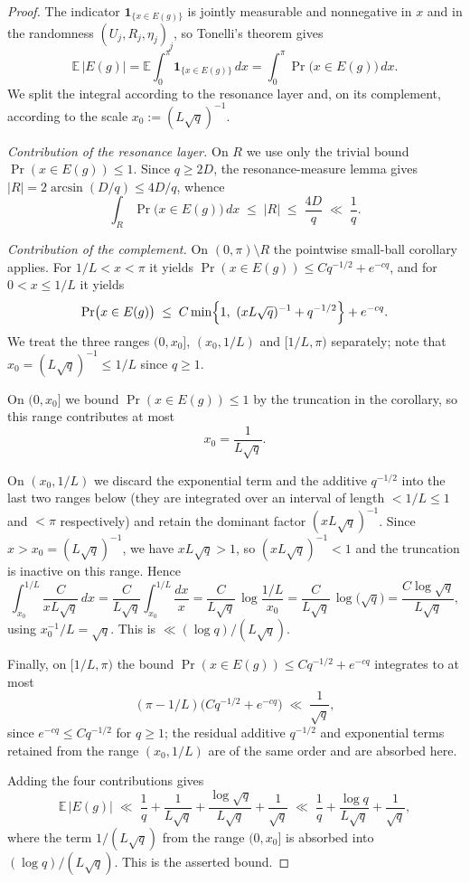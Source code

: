 \documentclass[11pt,reqno]{amsart}
\theoremstyle{plain}
\theoremstyle{definition}
\theoremstyle{remark}
\begin{document}
\begin{proof}
The indicator $\mathbf 1_{\{x\in E(g)\}}$ is jointly measurable and nonnegative in $x$ and in the randomness $(U_j,R_j,\eta_j)_j$, so Tonelli's theorem gives
\[
\mathbb{E}\,|E(g)|
=\mathbb{E}\int_{0}^{\pi}\mathbf 1_{\{x\in E(g)\}}\,dx
=\int_{0}^{\pi}\Pr\bigl(x\in E(g)\bigr)\,dx.
\]
We split the integral according to the resonance layer and, on its complement, according to the scale $x_{0}:=(L\sqrt q)^{-1}$.

\emph{Contribution of the resonance layer.}
On $R$ we use only the trivial bound $\Pr(x\in E(g))\le 1$. Since $q\ge 2D$, the resonance-measure lemma gives $|R|=2\arcsin(D/q)\le 4D/q$, whence
\[
\int_{R}\Pr\bigl(x\in E(g)\bigr)\,dx\;\le\;|R|\;\le\;\frac{4D}{q}\;\ll\;\frac{1}{q}.
\]

\emph{Contribution of the complement.}
On $(0,\pi)\setminus R$ the pointwise small-ball corollary applies. For $1/L<x<\pi$ it yields $\Pr(x\in E(g))\le C q^{-1/2}+e^{-cq}$, and for $0<x\le 1/L$ it yields
\[
\Pr\bigl(x\in E(g)\bigr)\;\le\;C\min\Bigl\{1,\ (xL\sqrt q)^{-1}+q^{-1/2}\Bigr\}+e^{-cq}.
\]
We treat the three ranges $(0,x_{0}]$, $(x_{0},1/L)$ and $[1/L,\pi)$ separately; note that $x_0=(L\sqrt q)^{-1}\le 1/L$ since $q\ge 1$.

On $(0,x_{0}]$ we bound $\Pr(x\in E(g))\le 1$ by the truncation in the corollary, so this range contributes at most
\[
x_{0}=\frac{1}{L\sqrt q}.
\]

On $(x_{0},1/L)$ we discard the exponential term and the additive $q^{-1/2}$ into the last two ranges below (they are integrated over an interval of length $<1/L\le 1$ and $<\pi$ respectively) and retain the dominant factor $(xL\sqrt q)^{-1}$. Since $x>x_{0}=(L\sqrt q)^{-1}$, we have $x L\sqrt q>1$, so $(xL\sqrt q)^{-1}<1$ and the truncation is inactive on this range. Hence
\[
\int_{x_{0}}^{1/L}\frac{C}{xL\sqrt q}\,dx
=\frac{C}{L\sqrt q}\int_{x_{0}}^{1/L}\frac{dx}{x}
=\frac{C}{L\sqrt q}\,\log\frac{1/L}{x_{0}}
=\frac{C}{L\sqrt q}\,\log\bigl(\sqrt q\bigr)
=\frac{C\log\sqrt q}{L\sqrt q},
\]
using $x_{0}^{-1}/L=\sqrt q$. This is $\ll (\log q)/(L\sqrt q)$.

Finally, on $[1/L,\pi)$ the bound $\Pr(x\in E(g))\le Cq^{-1/2}+e^{-cq}$ integrates to at most
\[
(\pi-1/L)\bigl(Cq^{-1/2}+e^{-cq}\bigr)\;\ll\;\frac{1}{\sqrt q},
\]
since $e^{-cq}\le C q^{-1/2}$ for $q\ge 1$; the residual additive $q^{-1/2}$ and exponential terms retained from the range $(x_0,1/L)$ are of the same order and are absorbed here.

Adding the four contributions gives
\[
\mathbb{E}\,|E(g)|\;\ll\;\frac{1}{q}+\frac{1}{L\sqrt q}+\frac{\log\sqrt q}{L\sqrt q}+\frac{1}{\sqrt q}
\;\ll\;\frac{1}{q}+\frac{\log q}{L\sqrt q}+\frac{1}{\sqrt q},
\]
where the term $1/(L\sqrt q)$ from the range $(0,x_0]$ is absorbed into $(\log q)/(L\sqrt q)$. This is the asserted bound.
\end{proof}
\end{document}
